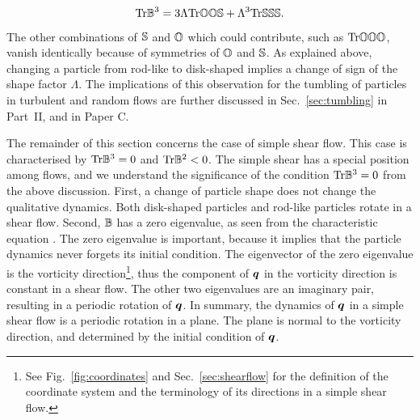 \documentclass[thesis.tex]{subfiles}
\begin{document}
\begin{align*}
	\mbox{Tr} \mathbb{B}^3 = 3\Lambda \mbox{Tr} \mathbb{O}\mathbb{O} \mathbb{S} + \Lambda^3 \mbox{Tr} \mathbb{S}\mathbb{S} \mathbb{S}.
\end{align*}
The other combinations of $\mathbb{S}$ and $\mathbb{O}$ which could contribute, such as $\mbox{Tr} \mathbb{O}\mathbb{O} \mathbb{O}$, vanish identically because of symmetries of $\mathbb{O}$ and $\mathbb{S}$. As explained above, changing a particle from rod-like to disk-shaped implies a change of sign of the shape factor $\Lambda$. The implications of this observation for the tumbling of particles in turbulent and random flows are further discussed in Sec.~\ref{sec:tumbling} in Part~II, and in Paper C. 

The remainder of this section concerns the case of simple shear flow. This case is characterised by $\mbox{Tr} \mathbb{B}^3=0$ and $\mbox{Tr} \mathbb{B}^2<0$. The simple shear has a special position among flows, and we understand the significance of the condition $\mbox{Tr}\mathbb{B}^3=0$ from the above discussion. First, a change of particle shape does not change the qualitative dynamics. Both disk-shaped particles and rod-like particles rotate in a shear flow. Second, $\mathbb{B}$ has a zero eigenvalue, as seen from the characteristic equation . The zero eigenvalue is important, because it implies that the particle dynamics never forgets its initial condition. The eigenvector of the zero eigenvalue is the vorticity direction\footnote{See Fig.~\ref{fig:coordinates} and Sec.~\ref{sec:shearflow} for the definition of the coordinate system and the terminology of its directions in a simple shear flow.}, thus the component of $\mbox{\boldmath$q$}$ in the vorticity direction is constant in a shear flow. The other two eigenvalues are an imaginary pair, resulting in a periodic rotation of $\mbox{\boldmath$q$}$. In summary, the dynamics of $\mbox{\boldmath$q$}$ in a simple shear flow is a periodic rotation in a plane. The plane is normal to the vorticity direction, and determined by the initial condition of $\mbox{\boldmath$q$}$.
\end{document}
